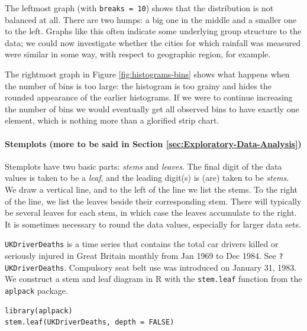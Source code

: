 \documentclass[captions=tableheading]{scrbook}
\begin{document}
\begin{example}
The leftmost graph (with \texttt{breaks = 10}) shows that the distribution is not balanced at all. There are two humps: a big one in the middle and a smaller one to the left. Graphs like this often indicate some underlying group structure to the data; we could now investigate whether the cities for which rainfall was measured were similar in some way, with respect to geographic region, for example.

The rightmost graph in Figure \ref{fig:histograms-bins} shows what happens when the number of bins is too large: the histogram is too grainy and hides the rounded appearance of the earlier histograms. If we were to continue increasing the number of bins we would eventually get all observed bins to have exactly one element, which is nothing more than a glorified strip chart.

\end{example}

\paragraph*{Stemplots (more to be said in Section \ref{sec:Exploratory-Data-Analysis})}

Stemplots have two basic parts: \emph{stems} and \emph{leaves}. The final digit of the data values is taken to be a \emph{leaf}, and the leading digit(s) is (are) taken to be \emph{stems}. We draw a vertical line, and to the left of the line we list the stems. To the right of the line, we list the leaves beside their corresponding stem. There will typically be several leaves for each stem, in which case the leaves accumulate to the right. It is sometimes necessary to round the data values, especially for larger data sets.

\begin{example}
\label{exa:-ukdriverdeaths-first}
\texttt{UKDriverDeaths} is a time series that contains the total car drivers killed or seriously injured in Great Britain monthly from Jan 1969 to Dec 1984. See \texttt{?UKDriverDeaths}. Compulsory seat belt use was introduced on January 31, 1983. We construct a stem and leaf diagram in \textsf{R} with the \texttt{stem.leaf} function from the \texttt{aplpack} package\cite{aplpack}.
\end{example}


\begin{verbatim}
library(aplpack)
stem.leaf(UKDriverDeaths, depth = FALSE)
\end{verbatim}
\end{document}
